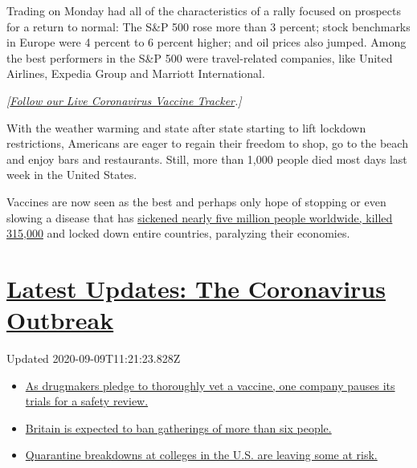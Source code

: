 Trading on Monday had all of the characteristics of a rally focused on
prospects for a return to normal: The S\&P 500 rose more than 3 percent;
stock benchmarks in Europe were 4 percent to 6 percent higher; and oil
prices also jumped. Among the best performers in the S\&P 500 were
travel-related companies, like United Airlines, Expedia Group and
Marriott International.

\emph{{[}}\href{https://www.nytimes3xbfgragh.onion/interactive/2020/science/coronavirus-vaccine-tracker.html}{\emph{Follow
our Live Coronavirus Vaccine Tracker}}\emph{.{]}}

With the weather warming and state after state starting to lift lockdown
restrictions, Americans are eager to regain their freedom to shop, go to
the beach and enjoy bars and restaurants. Still, more than 1,000 people
died most days last week in the United States.

Vaccines are now seen as the best and perhaps only hope of stopping or
even slowing a disease that has
\href{https://www.nytimes3xbfgragh.onion/interactive/2020/world/coronavirus-maps.html}{sickened
nearly five million people worldwide, killed 315,000} and locked down
entire countries, paralyzing their economies.

\hypertarget{latest-updates-the-coronavirus-outbreak}{%
\section{\texorpdfstring{\href{https://www.nytimes3xbfgragh.onion/2020/09/09/world/covid-19-coronavirus.html?action=click\&pgtype=Article\&state=default\&region=MAIN_CONTENT_1\&context=storylines_live_updates}{Latest
Updates: The Coronavirus
Outbreak}}{Latest Updates: The Coronavirus Outbreak}}\label{latest-updates-the-coronavirus-outbreak}}

Updated 2020-09-09T11:21:23.828Z

\begin{itemize}
\tightlist
\item
  \href{https://www.nytimes3xbfgragh.onion/2020/09/09/world/covid-19-coronavirus.html?action=click\&pgtype=Article\&state=default\&region=MAIN_CONTENT_1\&context=storylines_live_updates\#link-70cea8bb}{As
  drugmakers pledge to thoroughly vet a vaccine, one company pauses its
  trials for a safety review.}
\item
  \href{https://www.nytimes3xbfgragh.onion/2020/09/09/world/covid-19-coronavirus.html?action=click\&pgtype=Article\&state=default\&region=MAIN_CONTENT_1\&context=storylines_live_updates\#link-780eaa2f}{Britain
  is expected to ban gatherings of more than six people.}
\item
  \href{https://www.nytimes3xbfgragh.onion/2020/09/09/world/covid-19-coronavirus.html?action=click\&pgtype=Article\&state=default\&region=MAIN_CONTENT_1\&context=storylines_live_updates\#link-11cec4c0}{Quarantine
  breakdowns at colleges in the U.S. are leaving some at risk.}
\end{itemize}


